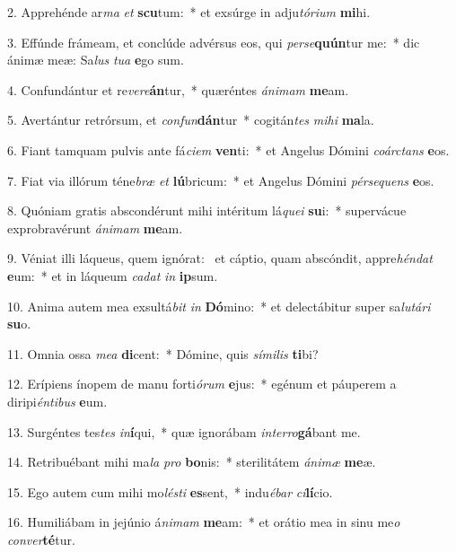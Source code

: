 2. Apprehénde ar\textit{ma} \textit{et} \textbf{scu}tum:~*  et exsúrge in adju\textit{tó}\textit{ri}\textit{um} \textbf{mi}hi.\

3. Effúnde frámeam, et conclúde advérsus eos, qui \textit{per}\textit{se}\textbf{quún}tur me:~*  dic ánimæ meæ: Sa\textit{lus} \textit{tu}\textit{a} \textbf{e}go sum.\

4. Confundántur et re\textit{ve}\textit{re}\textbf{án}tur,~*  quæréntes \textit{á}\textit{ni}\textit{mam} \textbf{me}am.\

5. Avertántur retrórsum, et \textit{con}\textit{fun}\textbf{dán}tur~*  cogitán\textit{tes} \textit{mi}\textit{hi} \textbf{ma}la.\

6. Fiant tamquam pulvis ante fá\textit{ci}\textit{em} \textbf{ven}ti:~*  et Angelus Dómini \textit{co}\textit{árc}\textit{tans} \textbf{e}os.\

7. Fiat via illórum téne\textit{bræ} \textit{et} \textbf{lú}bricum:~*  et Angelus Dómini \textit{pér}\textit{se}\textit{quens} \textbf{e}os.\

8. Quóniam gratis abscondérunt mihi intéritum lá\textit{que}\textit{i} \textbf{su}i:~*  supervácue exprobravérunt \textit{á}\textit{ni}\textit{mam} \textbf{me}am.\

9. Véniat illi láqueus, quem ignórat: \dag\  et cáptio, quam abscóndit, appre\textit{hén}\textit{dat} \textbf{e}um:~*  et in láqueum \textit{ca}\textit{dat} \textit{in} \textbf{ip}sum.\

10. Anima autem mea exsultá\textit{bit} \textit{in} \textbf{Dó}mino:~*  et delectábitur super sa\textit{lu}\textit{tá}\textit{ri} \textbf{su}o.\

11. Omnia ossa \textit{me}\textit{a} \textbf{di}cent:~*  Dómine, quis \textit{sí}\textit{mi}\textit{lis} \textbf{ti}bi?\

12. Erípiens ínopem de manu forti\textit{ó}\textit{rum} \textbf{e}jus:~*  egénum et páuperem a diripi\textit{én}\textit{ti}\textit{bus} \textbf{e}um.\

13. Surgéntes tes\textit{tes} \textit{in}\textbf{í}qui,~*  quæ ignorábam \textit{in}\textit{ter}\textit{ro}\textbf{gá}bant me.\

14. Retribuébant mihi ma\textit{la} \textit{pro} \textbf{bo}nis:~*  sterilitátem \textit{á}\textit{ni}\textit{mæ} \textbf{me}æ.\

15. Ego autem cum mihi mo\textit{lés}\textit{ti} \textbf{es}sent,~*  indu\textit{é}\textit{bar} \textit{ci}\textbf{lí}cio.\

16. Humiliábam in jejúnio á\textit{ni}\textit{mam} \textbf{me}am:~*  et orátio mea in sinu me\textit{o} \textit{con}\textit{ver}\textbf{té}tur.\

